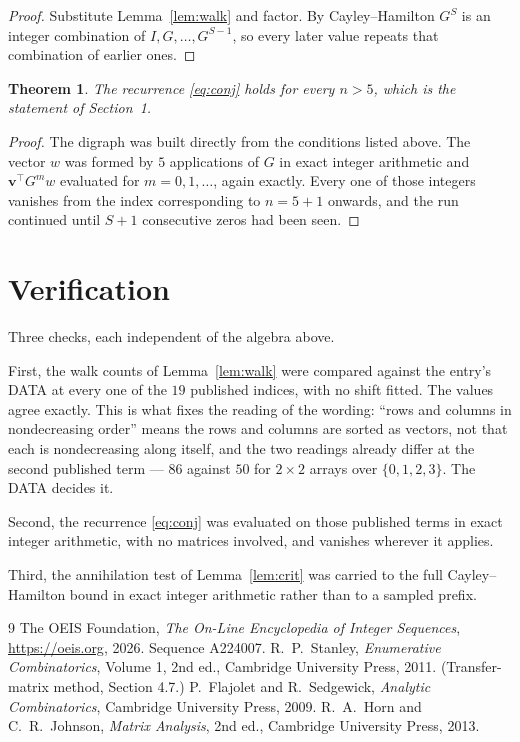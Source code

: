 \documentclass[11pt,a4paper]{article}
\theoremstyle{plain}
\newtheorem{theorem}{Theorem}
\theoremstyle{definition}
\begin{document}
\begin{proof}
Substitute Lemma~\ref{lem:walk} and factor. By Cayley--Hamilton $G^{S}$ is an integer
combination of $I,G,\dots,G^{S-1}$, so every later value repeats that combination of
earlier ones.
\end{proof}

\begin{theorem}
The recurrence \eqref{eq:conj} holds for every $n>5$, which is the statement of
Section~1.
\end{theorem}

\begin{proof}
The digraph was built directly from the conditions listed above. The vector $w$ was formed by
$5$ applications of $G$ in exact integer arithmetic and $\mathbf{v}^{\!\top}G^{m}w$
evaluated for $m=0,1,\dots$, again exactly. Every one of those integers vanishes from the
index corresponding to $n=5+1$ onwards, and the run continued until $S+1$ consecutive
zeros had been seen.
\end{proof}

\section{Verification}

Three checks, each independent of the algebra above.

First, the walk counts of Lemma~\ref{lem:walk} were compared against the entry's DATA at
every one of the $19$ published indices, with no shift fitted. The values agree exactly.
This is what fixes the reading of the wording: ``rows and columns in nondecreasing order''
means the rows and columns are sorted as vectors, not that each is nondecreasing along
itself, and the two readings already differ at the second published term --- $86$ against
$50$ for $2\times2$ arrays over $\{0,1,2,3\}$. The DATA decides it.

Second, the recurrence \eqref{eq:conj} was evaluated on those published terms in exact
integer arithmetic, with no matrices involved, and vanishes wherever it applies.

Third, the annihilation test of Lemma~\ref{lem:crit} was carried to the full
Cayley--Hamilton bound in exact integer arithmetic rather than to a sampled prefix.

\begin{thebibliography}{9}
 The OEIS Foundation, \emph{The On-Line Encyclopedia of Integer
Sequences}, \url{https://oeis.org}, 2026. Sequence A224007.
 R.~P.~Stanley, \emph{Enumerative Combinatorics}, Volume 1, 2nd ed.,
Cambridge University Press, 2011. (Transfer-matrix method, Section 4.7.)
 P.~Flajolet and R.~Sedgewick, \emph{Analytic Combinatorics}, Cambridge
University Press, 2009.
 R.~A.~Horn and C.~R.~Johnson, \emph{Matrix Analysis}, 2nd ed., Cambridge
University Press, 2013.
\end{thebibliography}
\end{document}
